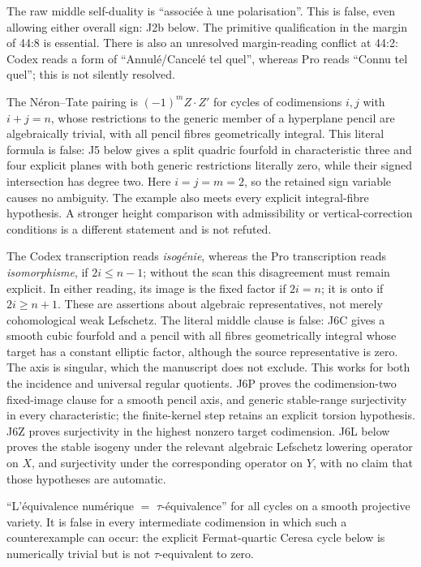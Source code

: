 \begin{description}
The raw middle self-duality is ``associée à une polarisation''.
This is false, even allowing either overall sign: J2b below.
The primitive qualification in the margin of 44:8 is essential.
There is also an unresolved margin-reading conflict at 44:2:
Codex reads a form of ``Annulé/Cancelé tel quel'', whereas Pro
reads ``Connu tel quel''; this is not silently resolved.
\item[Theorem 5, 44:4.]
The Néron--Tate pairing is $(-1)^mZ\cdot Z'$ for cycles of
codimensions $i,j$ with $i+j=n$, whose restrictions to the generic
member of a hyperplane pencil are algebraically trivial, with all
pencil fibres geometrically integral. This literal formula is false:
J5 below gives a split quadric fourfold in characteristic three and
four explicit planes with both generic restrictions literally zero,
while their signed intersection has degree two. Here $i=j=m=2$,
so the retained sign variable causes no ambiguity. The example
also meets every explicit integral-fibre hypothesis. A stronger
height comparison with admissibility or vertical-correction
conditions is a different statement and is not refuted.
\item[Theorem 6, 44:4.]
The Codex transcription reads \emph{isogénie}, whereas the Pro
transcription reads \emph{isomorphisme}, if $2i\leq n-1$;
without the scan this disagreement must remain explicit.  In
either reading, its image
is the fixed factor if $2i=n$; it is onto if $2i\geq n+1$.
These are assertions about algebraic representatives, not merely
cohomological weak Lefschetz. The literal middle clause is false:
J6C gives a smooth cubic fourfold and a pencil with all fibres
geometrically integral whose target has a constant elliptic factor,
although the source representative is zero. The axis is singular,
which the manuscript does not exclude. This works for both the
incidence and universal regular quotients. J6P proves the
codimension-two fixed-image clause for a smooth pencil axis, and
generic stable-range surjectivity in every characteristic; the
finite-kernel step retains an explicit torsion hypothesis. J6Z
proves surjectivity in the highest nonzero target codimension.
J6L below proves
the stable isogeny under the relevant algebraic Lefschetz lowering
operator on $X$, and surjectivity under the corresponding operator
on $Y$, with no claim that those hypotheses are automatic.
\item[Theorem 7, 44:6.]
``L'équivalence numérique $=$ $\tau$-équivalence'' for all cycles
on a smooth projective variety.  It is false in every intermediate codimension in which such
a counterexample can occur: the explicit Fermat-quartic Ceresa
cycle below is numerically trivial but is not $\tau$-equivalent
to zero.
\end{description}

